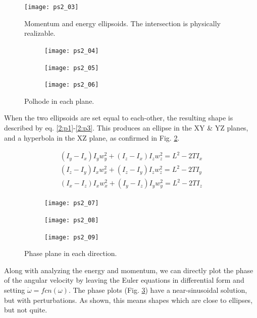 \documentclass[12pt, letterpaper]{article}
\begin{document}
\begin{figure}[H]
	\centering
	\texttt{[image: ps2\_03]}
	\caption{Momentum and energy ellipsoids. The intersection is physically realizable.}
	\label{2:ellipsoids}
\end{figure}


\begin{figure}[H]
	\centering
	\begin{subfigure}[b]{0.32\textwidth}
		\texttt{[image: ps2\_04]}
	\end{subfigure}
	\begin{subfigure}[b]{0.32\textwidth}
		\texttt{[image: ps2\_05]}
	\end{subfigure}
	\begin{subfigure}[b]{0.32\textwidth}
		\texttt{[image: ps2\_06]}
	\end{subfigure}
	\caption{Polhode in each plane.}
	\label{2:polhodePlanes}
\end{figure}

When the two ellipsoids are set equal to each-other, the resulting shape is described by eq. \ref{2:p1}-\ref{2:p3}. This produces an ellipse in the XY \& YZ planes, and a hyperbola in the XZ plane, as confirmed in Fig. \ref{2:polhodePlanes}.

\begin{gather}
\label{2:p1}
(I_y-I_x)I_yw_y^2+(I_z-I_x)I_zw_z^2=L^2-2TI_x \\
\label{2:p2}
(I_z-I_y)I_xw_x^2+(I_z-I_y)I_zw_z^2=L^2-2TI_y \\
\label{2:p3}
(I_x-I_z)I_xw_x^2+(I_y-I_z)I_yw_y^2=L^2-2TI_z
\end{gather}


\begin{figure}[H]
	\centering
	\begin{subfigure}[b]{0.32\textwidth}
		\texttt{[image: ps2\_07]}
	\end{subfigure}
	\begin{subfigure}[b]{0.32\textwidth}
		\texttt{[image: ps2\_08]}
	\end{subfigure}
	\begin{subfigure}[b]{0.32\textwidth}
		\texttt{[image: ps2\_09]}
	\end{subfigure}
	\caption{Phase plane in each direction.}
	\label{2:phaseplane}
\end{figure}

Along with analyzing the energy and momentum, we can directly plot the phase of the angular velocity by leaving the Euler equations in differential form and setting $\dot{\omega}=fcn(\omega)$. The phase plots (Fig. \ref{2:phaseplane}) have a near-sinusoidal solution, but with perturbations. As shown, this means shapes which are close to ellipses, but not quite.
\end{document}
